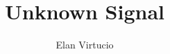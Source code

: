 \documentclass[a4paper,11pt]{article}
\begin{document}
\title{\huge \textbf{Unknown Signal}}
\author{Elan Virtucio}
\maketitle
\end{document}
